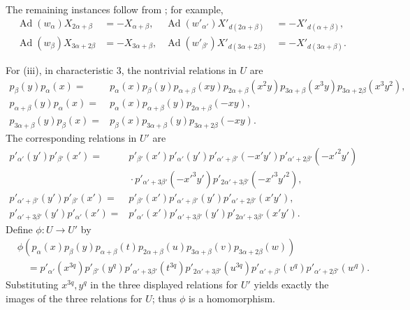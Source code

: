 The remaining instances follow from ; for
example,
\[
\begin{aligned}
 \operatorname{Ad}(w_\alpha)X_{2\alpha+\beta}&=-X_{\alpha+\beta},&
 \operatorname{Ad}(w'_{\alpha'})X'_{d(2\alpha+\beta)}
   &=-X'_{d(\alpha+\beta)},\\
 \operatorname{Ad}(w_\beta)X_{3\alpha+2\beta}&=-X_{3\alpha+\beta},&
 \operatorname{Ad}(w'_{\beta'})X'_{d(3\alpha+2\beta)}
   &=-X'_{d(3\alpha+\beta)}.
\end{aligned}
\]

For (iii), in characteristic \(3\), the nontrivial relations in
\(U\) are
\[
\begin{aligned}
 p_\beta(y)p_\alpha(x)
  ={}&p_\alpha(x)p_\beta(y)p_{\alpha+\beta}(xy)
  p_{2\alpha+\beta}(x^2y)p_{3\alpha+\beta}(x^3y)
  p_{3\alpha+2\beta}(x^3y^2),\\
 p_{\alpha+\beta}(y)p_\alpha(x)
  ={}&p_\alpha(x)p_{\alpha+\beta}(y)p_{2\alpha+\beta}(-xy),\\
 p_{3\alpha+\beta}(y)p_\beta(x)
  ={}&p_\beta(x)p_{3\alpha+\beta}(y)p_{3\alpha+2\beta}(-xy).
\end{aligned}
\]
The corresponding relations in \(U'\) are
\[
\begin{aligned}
 p'_{\alpha'}(y')p'_{\beta'}(x')
  ={}&p'_{\beta'}(x')p'_{\alpha'}(y')
  p'_{\alpha'+\beta'}(-x'y')p'_{\alpha'+2\beta'}(-x'^2y')\\
  &{}\cdot p'_{\alpha'+3\beta'}(-x'^3y')
  p'_{2\alpha'+3\beta'}(-x'^3y'^2),\\
 p'_{\alpha'+\beta'}(y')p'_{\beta'}(x')
  ={}&p'_{\beta'}(x')p'_{\alpha'+\beta'}(y')
  p'_{\alpha'+2\beta'}(x'y'),\\
 p'_{\alpha'+3\beta'}(y')p'_{\alpha'}(x')
  ={}&p'_{\alpha'}(x')p'_{\alpha'+3\beta'}(y')
  p'_{2\alpha'+3\beta'}(x'y').
\end{aligned}
\]
Define \(\phi:U\to U'\) by
\[
\begin{aligned}
 &\phi\!\left(
 p_\alpha(x)p_\beta(y)p_{\alpha+\beta}(t)p_{2\alpha+\beta}(u)
 p_{3\alpha+\beta}(v)p_{3\alpha+2\beta}(w)\right)\\
 &\quad=
 p'_{\alpha'}(x^{3q})p'_{\beta'}(y^q)
 p'_{\alpha'+3\beta'}(t^{3q})p'_{2\alpha'+3\beta'}(u^{3q})
 p'_{\alpha'+\beta'}(v^q)p'_{\alpha'+2\beta'}(w^q).
\end{aligned}
\]
Substituting \(x^{3q},y^q\) in the three displayed relations for
\(U'\) yields exactly the images of the three relations for \(U\);
thus \(\phi\) is a homomorphism.


